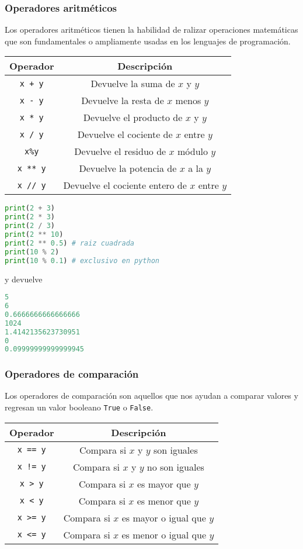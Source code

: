 	\subsubsection{Operadores aritméticos}
	Los operadores aritméticos tienen la habilidad de ralizar operaciones matemáticas que son fundamentales o ampliamente usadas en los lenguajes de programación.
	\begin{center}
		\begin{tabular}{|c|c|}
			\hline
			Operador & Descripción \\
			\hline
			\texttt{x + y}& Devuelve la suma de $ x $ y $ y $ \\
			\hline
			\texttt{x - y}& Devuelve la resta de $ x $ menos $ y $ \\
			\hline
			\texttt{x * y}& Devuelve el producto de $ x $ y $ y $ \\
			\hline
			\texttt{x / y}& Devuelve el cociente de $ x $ entre $ y $ \\
			\hline
			\texttt{x\%y}& Devuelve el residuo de $ x $ módulo $ y $ \\
			\hline
			\texttt{x ** y}& Devuelve la potencia de $ x $ a la $ y $ \\
			\hline
			\texttt{x // y}& Devuelve el cociente entero de $ x $ entre $ y $ \\
			\hline
		\end{tabular}
	\end{center}
	\begin{lstlisting}[language={python}]
print(2 + 3)
print(2 * 3)
print(2 / 3)
print(2 ** 10)
print(2 ** 0.5) # raiz cuadrada
print(10 % 2)
print(10 % 0.1) # exclusivo en python 
	\end{lstlisting}
    y devuelve 
    \begin{lstlisting}[language={python}]
5
6
0.6666666666666666
1024
1.4142135623730951
0
0.09999999999999945
    \end{lstlisting}
	\subsubsection{Operadores de comparación}
	Los operadores de comparación son aquellos que nos ayudan a comparar valores y regresan un valor booleano \texttt{True} o \texttt{False}.
	\begin{center}
		\begin{tabular}{|c|c|}
			\hline
			Operador & Descripción \\
			\hline
			\texttt{x == y}& Compara si $ x $ y $ y $ son iguales \\
			\hline
			\texttt{x != y}& Compara si $ x $ y $ y $ no son iguales \\
			\hline
			\texttt{x >\ y}& Compara si $ x $ es mayor que $ y $ \\
			\hline
			\texttt{x <\ y}& Compara si $ x $ es menor que $ y $ \\
			\hline
			\texttt{x >= y}& Compara si $ x $ es mayor o igual que $ y $ \\
			\hline
			\texttt{x <= y}& Compara si $ x $ es menor o igual que $ y $ \\
			\hline
		\end{tabular}
	\end{center}
